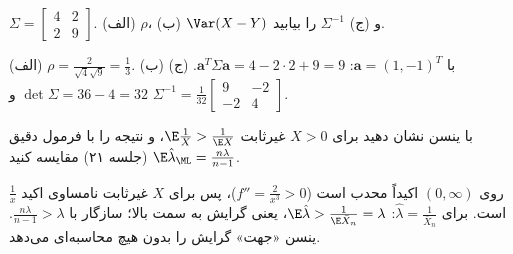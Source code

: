 \begin{exercise}
$\Sigma=\begin{bmatrix}4&2\\2&9\end{bmatrix}$. (الف) $\rho$، (ب) $\Var(X-Y)$ و (ج) $\Sigma^{-1}$ را بیابید.
\end{exercise}
\begin{solution}
(الف) $\rho=\frac{2}{\sqrt4\sqrt9}=\frac13$.
(ب) با $\mathbf a=(1,-1)^T$: $\mathbf a^T\Sigma\mathbf a=4-2\cdot2+9=9$.
(ج) $\det\Sigma=36-4=32$ و $\Sigma^{-1}=\frac{1}{32}\begin{bmatrix}9&-2\\-2&4\end{bmatrix}$.
\end{solution}

\begin{exercise}
با ینسن نشان دهید برای $X>0$ غیرثابت $\E\frac1X>\frac{1}{\E X}$، و نتیجه را با فرمول دقیق $\E\hat\lambda_\ML=\frac{n\lambda}{n-1}$ (جلسه ۲۱) مقایسه کنید.
\end{exercise}
\begin{solution}
$\frac1x$ روی $(0,\infty)$ اکیداً محدب است ($f''=\frac{2}{x^3}>0$)، پس برای $X$ غیرثابت نامساوی اکید است. برای $\hat\lambda=\frac{1}{\bar X_n}$: $\E\hat\lambda>\frac{1}{\E\bar X_n}=\lambda$، یعنی گرایش به سمت بالا؛ سازگار با $\frac{n\lambda}{n-1}>\lambda$. ینسن «جهت» گرایش را بدون هیچ محاسبه‌ای می‌دهد.
\end{solution}
